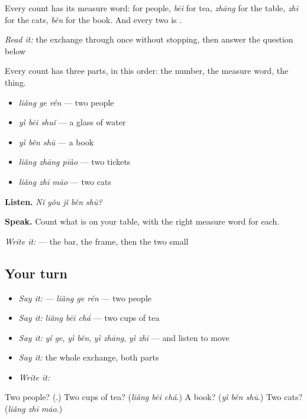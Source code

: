 Every count has its measure word:  for people, \emph{bēi} for tea, \emph{zhāng} for the table, \emph{zhī} for the cats, \emph{běn} for the book. And every two is .

\begin{tcolorbox}[breakable,skin=enhanced,colback=orange!6,colframe=orange!45!black,boxrule=0.5pt,arc=1mm,left=6pt,right=6pt,top=4pt,bottom=4pt,fonttitle=\bfseries,title={Read this}]
\emph{Read it:} the exchange through once without stopping, then answer the question below
\end{tcolorbox}

\begin{grammarlens}[title={What you've built — a number, a measure word, a thing}]
Every count has three parts, in this order: the number, the measure word, the thing.

\begin{itemize}
\raggedright
  \item \textbf{} \emph{liǎng ge rén} — two people
  \item \emph{yì bēi shuǐ} — a glass of water
  \item \emph{yì běn shū} — a book
  \item \emph{liǎng zhāng piào} — two tickets
  \item \emph{liǎng zhī māo} — two cats
\end{itemize}

\textbf{Listen.} \emph{Nǐ yǒu jǐ běn shū?}

\textbf{Speak.} Count what is on your table, with the right measure word for each.

\emph{Write it:}  — the bar, the frame, then the two small 
\end{grammarlens}

\subsection*{Your turn}
\begin{itemize}
\raggedright
  \item \emph{Say it:}  — \emph{liǎng ge rén} — two people
  \item \emph{Say it:} \emph{liǎng bēi chá} — two cups of tea
  \item \emph{Say it:} \emph{yí ge}, \emph{yì běn}, \emph{yì zhāng}, \emph{yì zhī} — and listen to  move
  \item \emph{Say it:} the whole exchange, both parts
  \item \emph{Write it:} 
\end{itemize}

\begin{tcolorbox}[breakable,colback=teal!4,colframe=teal!35!black,title={Before you move on}]
Two people? (\textbf{}.) Two cups of tea? (\emph{liǎng bēi chá}.) A book? (\emph{yì běn shū}.) Two cats? (\emph{liǎng zhī māo}.)
\end{tcolorbox}
